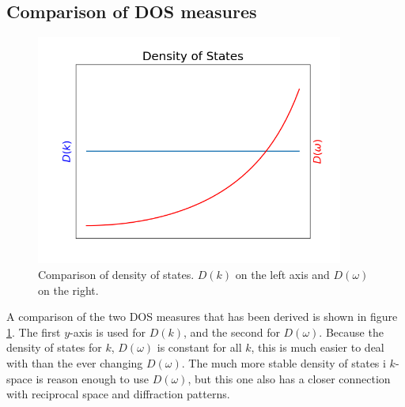 \documentclass[11pt]{amsart}
\begin{document}
\subsection{Comparison of DOS measures}
\begin{figure}
\centering
	\includegraphics[width = 0.9\textwidth]{DOS.png}
	\caption{Comparison of density of states. $D(k)$ on the left axis and $D(\omega)$ on the right.}
	\label{fig:DOS}
\end{figure}

A comparison of the two DOS measures that has been derived is shown in figure \ref{fig:DOS}. The first $y$-axis is used for $D(k)$, and the second for $D(\omega)$. Because the density of states for $k$, $D(\omega)$ is constant for all $k$, this is much easier to deal with than the ever changing $D(\omega)$. The much more stable density of states i $k$-space is reason enough to use $D(\omega)$, but this one also has a closer connection with reciprocal space and diffraction patterns.
\end{document}
